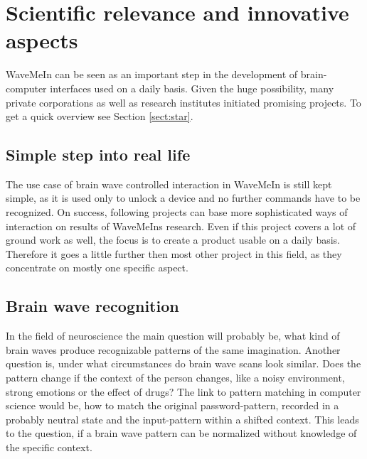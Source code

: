 \section{Scientific relevance and innovative aspects}
\label{sect:relevance}

WaveMeIn can be seen as an important step in the development of brain-computer interfaces used on a daily basis. Given the huge possibility, many private corporations as well as research institutes initiated promising projects. To get a quick overview see Section \ref{sect:star}.

\subsection{Simple step into real life}
The use case of brain wave controlled interaction in WaveMeIn is still kept simple, as it is used only to unlock a device and no further commands have to be recognized. On success, following projects can base more sophisticated ways of interaction on results of WaveMeIns research. Even if this project covers a lot of ground work as well, the focus is to create a product usable on a daily basis. Therefore it goes a little further then most other project in this field, as they concentrate on mostly one specific aspect.

\subsection{Brain wave recognition}
In the field of neuroscience the main question will probably be, what kind of brain waves produce recognizable patterns of the same imagination. Another question is, under what circumstances do brain wave scans look similar. Does the pattern change if the context of the person changes, like a noisy environment, strong emotions or the effect of drugs?
The link to pattern matching in computer science would be, how to match the original password-pattern, recorded in a probably neutral state and the input-pattern within a shifted context. This leads to the question, if a brain wave pattern can be normalized without knowledge of the specific context.

